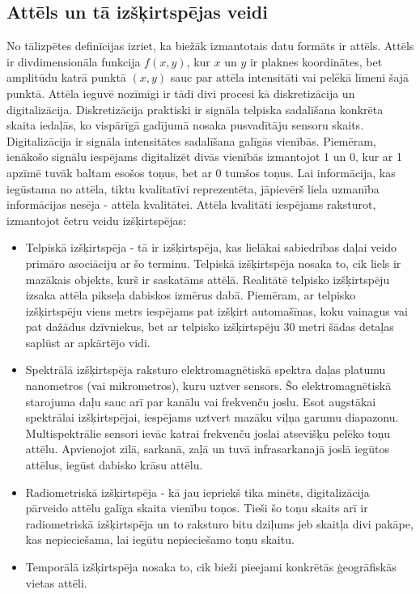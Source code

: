 \documentclass[12pt,paper=a4]{report}
\begin{document}
\subsection{Attēls un tā izšķirtspējas veidi}
No tālizpētes definīcijas izriet, ka biežāk izmantotais datu formāts ir attēls. Attēls ir divdimensionāla funkcija \(f(x,y)\), kur \(x\) un \(y\) ir plaknes koordinātes, bet amplitūdu katrā punktā \((x,y)\) sauc par attēla intensitāti vai pelēkā līmeni šajā punktā. Attēla ieguvē nozīmīgi ir tādi divi procesi kā diskretizācija un digitalizācija. Diskretizācija praktiski ir signāla telpiska sadalīšana konkrēta skaita iedaļās, ko vispārīgā gadījumā nosaka pusvadītāju sensoru skaits. Digitalizācija ir signāla intensitātes sadalīšana galīgās vienībās. Piemēram, ienākošo signālu iespējams digitalizēt divās vienībās izmantojot 1 un 0, kur ar 1 apzīmē tuvāk baltam esošos toņus, bet ar 0 tumšos toņus. Lai informācija, kas iegūstama no attēla, tiktu kvalitatīvi reprezentēta, jāpievērš liela uzmanība informācijas nesēja - attēla kvalitātei. Attēla kvalitāti iespējams raksturot, izmantojot četru veidu izšķirtspējas:
\begin{itemize}
\item Telpiskā izšķirtspēja - tā ir izšķirtspēja, kas lielākai sabiedrības daļai veido primāro asociāciju ar šo terminu. Telpiskā izšķirtspēja nosaka to, cik liels ir mazākais objekts, kurš ir saskatāms attēlā. Realitātē telpisko izšķirtspēju izsaka attēla pikseļa dabiskos izmērus dabā. Piemēram, ar telpisko izšķirtspēju viens metrs iespējams pat izšķirt automašīnas, koku vainagus vai pat dažādus dzīvniekus, bet ar telpisko izšķirtspēju 30 metri šādas detaļas saplūst ar apkārtējo vidi.
\item Spektrālā izšķirtspēja raksturo elektromagnētiskā spektra daļas platumu nanometros (vai mikrometros), kuru uztver sensors. Šo elektromagnētiskā starojuma daļu sauc arī par kanālu vai frekvenču joslu. Esot augstākai spektrālai izšķirtspējai, iespējams uztvert mazāku viļņa garumu diapazonu. Multispektrālie sensori ievāc katrai frekvenču joslai atsevišķu pelēko toņu attēlu. Apvienojot zilā, sarkanā, zaļā un tuvā infrasarkanajā joslā iegūtos attēlus, iegūst dabisko krāsu attēlu. 
\item Radiometriskā izšķirtspēja - kā jau iepriekš tika minēts, digitalizācija pārveido attēlu galīga skaita vienību toņos. Tieši šo toņu skaits arī ir radiometriskā izšķirtspēja un to raksturo bitu dziļums jeb skaitļa divi pakāpe, kas nepieciešama, lai iegūtu nepieciešamo toņu skaitu.
\item Temporālā izšķirtspēja nosaka to, cik bieži pieejami konkrētās ģeogrāfiskās vietas attēli. \cite{gonzalez2002digital}
\end{itemize}
\end{document}
